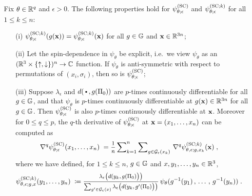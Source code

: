 \begin{theorem} \label{thm:SC} Fix $\theta \in \mathbb{R}^q$ and $\epsilon > 0$.  The following properties hold for $\psi^{(\rm SC)}_{\theta;\epsilon}$ and $\psi^{({\rm SC};k)}_{\theta;\epsilon}$ for all $1 \leq k \leq n$:
\begin{enumerate}
    \item[(i)] $\psi^{({\rm SC};k)}_{\theta;\epsilon}(g(\mathbf{x})) =  \psi^{({\rm SC};k)}_{\theta;\epsilon}(\mathbf{x})$ for all $g \in \mathbb{G}$ and $\mathbf{x} \in \mathbb{R}^{3n}$;
    \item[(ii)] Let the spin-dependence in $\psi_\theta$ be explicit, i.e.~we view $\psi_\theta$ as an $(\mathbb{R}^3 \times \{\uparrow, \downarrow \})^n \rightarrow \mathbb{C}$ function. If $\psi_\theta$ is anti-symmetric with respect to permutations of $(x_i, \sigma_i)$, then so is $\psi^{(\rm SC)}_{\theta;\epsilon}$;
    \item[(iii)] Suppose $\lambda_\epsilon$ and $d(\argdot, g(\Pi_0))$ are $p$-times continuously differentiable for all $g \in \mathbb{G}$, and that $\psi_\theta$ is $p$-times continuously differentiable at $g(\mathbf{x}) \in \mathbb{R}^{3n}$ for all $g \in \mathbb{G}$. Then $\psi^{(\rm SC)}_{\theta;\epsilon}$ is also $p$-times continuously differentiable at $\mathbf{x}$. Moreover for $0 \leq q \leq p$, the $q$-th derivative of $\psi^{(\rm SC)}_{\theta;\epsilon}$ at $\mathbf{x}=(x_1, \ldots, x_n)$ can be computed as 
        \begin{align*}
            \nabla^q 
            \psiSC_{\theta;\epsilon}(x_1, \ldots, x_n)
            \;=&\;
            \mfrac{1}{n}
            \msum_{k=1}^n
            \msum_{g \in \cG_\epsilon(x_k)}
            \,
            \nabla^q 
            \psiSCk_{\theta,\epsilon;g,x_k}
            (\bx)\;,
        \end{align*}
        where we have defined, for $1 \leq k \leq n$, $g \in \mathbb{G}$ and $x, y_1, \ldots, y_n \in \mathbb{R}^3$, 
        \begin{align*}
            \psiSCk_{\theta,\epsilon;g,x}
            (y_1, \ldots, y_n)
            \;\coloneqq&\;
            \mfrac{
                \lambda_\epsilon
                \big( d( y_k, g(\Pi_0) \big) \big) 
            }{
                \sum_{g' \in \cG_\epsilon(x)}
                \lambda_\epsilon
                \big( d( y_k, g'(\Pi_0) \big) \big) 
            }
            \,
            \psi_\theta( g^{-1}(y_1) \,,\, \ldots \,,\, g^{-1}(y_n) )
            \;.
        \end{align*}
\end{enumerate}   
\end{theorem}

